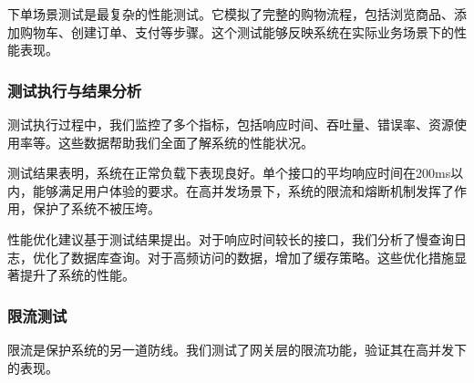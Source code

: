 \documentclass[a4paper,12pt]{article}
\begin{document}
下单场景测试是最复杂的性能测试。它模拟了完整的购物流程，包括浏览商品、添加购物车、创建订单、支付等步骤。这个测试能够反映系统在实际业务场景下的性能表现。

\subsubsection{测试执行与结果分析}

\begin{center}
\end{center}

测试执行过程中，我们监控了多个指标，包括响应时间、吞吐量、错误率、资源使用率等。这些数据帮助我们全面了解系统的性能状况。

\begin{center}
\end{center}

测试结果表明，系统在正常负载下表现良好。单个接口的平均响应时间在200ms以内，能够满足用户体验的要求。在高并发场景下，系统的限流和熔断机制发挥了作用，保护了系统不被压垮。

性能优化建议基于测试结果提出。对于响应时间较长的接口，我们分析了慢查询日志，优化了数据库查询。对于高频访问的数据，增加了缓存策略。这些优化措施显著提升了系统的性能。

\subsubsection{限流测试}

限流是保护系统的另一道防线。我们测试了网关层的限流功能，验证其在高并发下的表现。

\begin{center}
\end{center}
\end{document}
